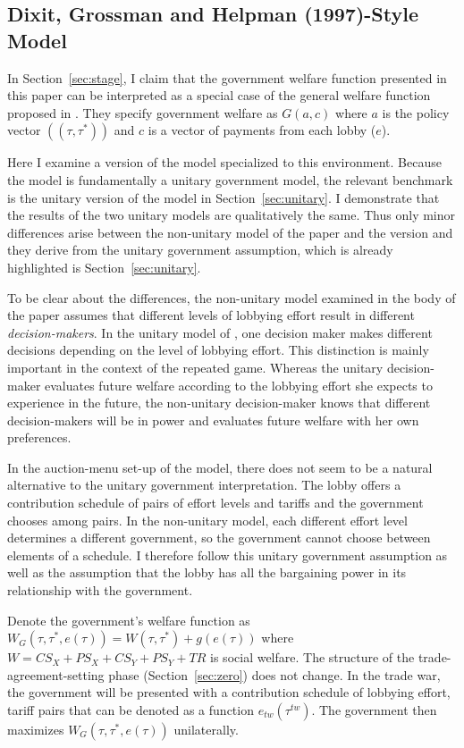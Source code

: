 \documentclass[authoryear, review]{elsarticle}
\begin{document}
\subsection{Dixit, Grossman and Helpman (1997)-Style Model}
\label{sec:dgh}
In Section~\ref{sec:stage}, I claim that the government welfare function presented in this paper can be interpreted as a special case of the general welfare function proposed in \citet{dgh97}. They specify government welfare as $G(a,c)$ where $a$ is the policy vector $\left(\left(\tau,\tau^*\right)\right)$ and $c$ is a vector of payments from each lobby ($e$). 

Here I examine a version of the \citet{dgh97} model specialized to this environment. Because the \citet{dgh97} model is fundamentally a unitary government model, the relevant benchmark is the unitary version of the model in Section~\ref{sec:unitary}. I demonstrate that the results of the two unitary models are qualitatively the same. Thus only minor differences arise between the non-unitary model of the paper and the \citet{dgh97} version and they derive from the unitary government assumption, which is already highlighted is Section~\ref{sec:unitary}.

To be clear about the differences, the non-unitary model examined in the body of the paper assumes that different levels of lobbying effort result in different \textit{decision-makers}. In the unitary model of \citet{dgh97}, one decision maker makes different decisions depending on the level of lobbying effort. This distinction is mainly important in the context of the repeated game. Whereas the unitary decision-maker evaluates future welfare according to the lobbying effort she expects to experience in the future, the non-unitary decision-maker knows that different decision-makers will be in power and evaluates future welfare with her own preferences.

In the auction-menu set-up of the \citet{dgh97} model, there does not seem to be a natural alternative to the unitary government interpretation. The lobby offers a contribution schedule of pairs of effort levels and tariffs and the government chooses among pairs. In the non-unitary model, each different effort level determines a different government, so the government cannot choose between elements of a schedule. I therefore follow this unitary government assumption as well as the assumption that the lobby has all the bargaining power in its relationship with the government.

Denote the government's welfare function as $W_G(\tau,\tau^*,e(\tau)) = W(\tau,\tau^*) + g(e(\tau))$ where $W = CS_X + PS_X + CS_Y + PS_Y +TR$ is social welfare. The structure of the trade-agreement-setting phase (Section~\ref{sec:zero}) does not change. In the trade war, the government will be presented with a contribution schedule of lobbying effort, tariff pairs that can be denoted as a function $e_{tw}(\tau^{tw})$. The government then maximizes $W_G(\tau,\tau^*,e(\tau))$ unilaterally.
\end{document}
